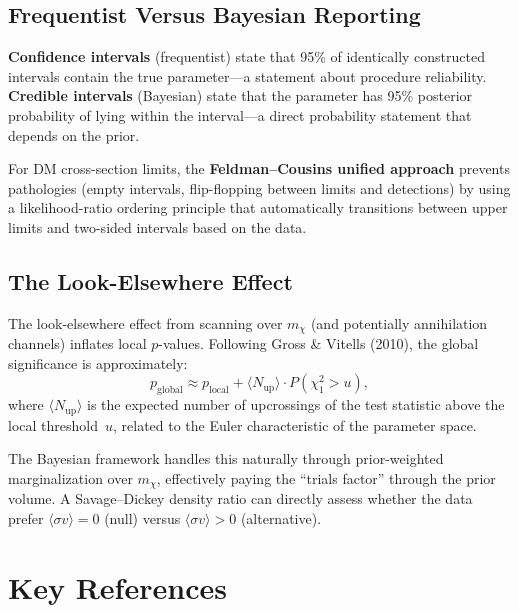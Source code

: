 \documentclass[10pt,a4paper]{article}
\newcommand{\sigmav}{\langle\sigma v\rangle}
\newcommand{\mchi}{m_\chi}
\begin{document}
\subsection{Frequentist Versus Bayesian Reporting}

\textbf{Confidence intervals} (frequentist) state that 95\% of identically constructed intervals contain the true parameter---a statement about procedure reliability. \textbf{Credible intervals} (Bayesian) state that the parameter has 95\% posterior probability of lying within the interval---a direct probability statement that depends on the prior.

For DM cross-section limits, the \textbf{Feldman--Cousins unified approach} prevents pathologies (empty intervals, flip-flopping between limits and detections) by using a likelihood-ratio ordering principle that automatically transitions between upper limits and two-sided intervals based on the data.


\subsection{The Look-Elsewhere Effect}

The look-elsewhere effect from scanning over $\mchi$ (and potentially annihilation channels) inflates local $p$-values. Following Gross \& Vitells (2010), the global significance is approximately:
\begin{equation}
p_{\mathrm{global}} \approx p_{\mathrm{local}} + \langle N_{\mathrm{up}} \rangle \cdot P(\chi^2_1 > u),
\end{equation}
where $\langle N_{\mathrm{up}} \rangle$ is the expected number of upcrossings of the test statistic above the local threshold~$u$, related to the Euler characteristic of the parameter space.

The Bayesian framework handles this naturally through prior-weighted marginalization over $\mchi$, effectively paying the ``trials factor'' through the prior volume. A Savage--Dickey density ratio can directly assess whether the data prefer $\sigmav = 0$ (null) versus $\sigmav > 0$ (alternative).


\section{Key References}
\label{sec:references}
\end{document}
